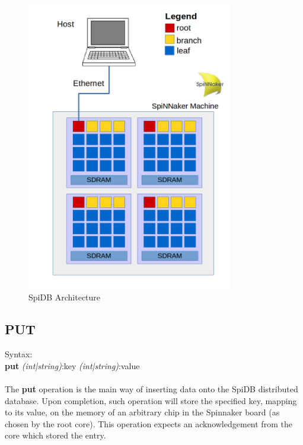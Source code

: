 \begin{figure}
\begin{center}
	\includegraphics[width=0.8\textwidth, natwidth=794, natheight=1123]{images/spiDB_architecture.png}
\end{center}
\caption{SpiDB Architecture}
\end{figure}


\subsection{PUT}

Syntax:\\
\noindent
 {\large\textbf{put} \textit{(int|string)}:key \textit{(int|string)}:value} \\\\

The \textbf{put} operation is the main way of inserting data onto the SpiDB distributed database. 
Upon completion, such operation will store the specified key, mapping to its value, on the memory of an arbitrary chip in the Spinnaker board (as chosen by the root core). This operation expects an acknowledgement from the core which stored the entry.\\\\

